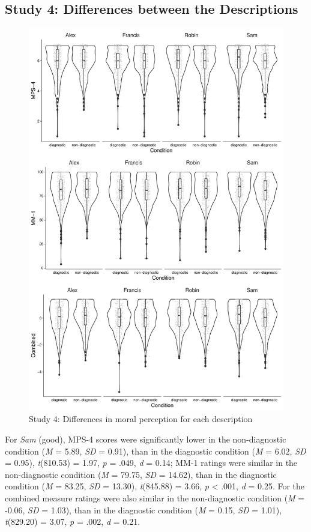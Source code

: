 \documentclass[
  american,
  man,floatsintext]{apa7}
\begin{document}
\newpage

\hypertarget{study-4-differences-between-the-descriptions}{%
\subsection{Study 4: Differences between the Descriptions}\label{study-4-differences-between-the-descriptions}}

\newpage

\begin{figure}[!p]
\includegraphics{Supplementary_files/figure-latex/S4allscenariosPlot-1} \caption{Study 4: Differences in moral perception for each description}\label{fig:S4allscenariosPlot}
\end{figure}

For \emph{Sam} (good), MPS-4 scores were significantly lower in the non-diagnostic condition (\emph{M} = 5.89, \emph{SD} = 0.91), than in the diagnostic condition (\emph{M} = 6.02, \emph{SD} = 0.95), \emph{t}(810.53) = 1.97, \emph{p} = .049, \emph{d} = 0.14; MM-1 ratings were similar in the non-diagnostic condition (\emph{M} = 79.75, \emph{SD} = 14.62), than in the diagnostic condition (\emph{M} = 83.25, \emph{SD} = 13.30), \emph{t}(845.88) = 3.66, \emph{p} \textless{} .001, \emph{d} = 0.25. For the combined measure ratings were also similar in the non-diagnostic condition (\emph{M} = -0.06, \emph{SD} = 1.03), than in the diagnostic condition (\emph{M} = 0.15, \emph{SD} = 1.01), \emph{t}(829.20) = 3.07, \emph{p} = .002, \emph{d} = 0.21.
\end{document}

